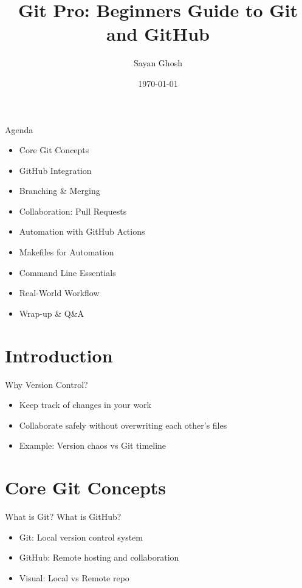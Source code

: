\documentclass[aspectratio=169]{beamer} %
\title[Git Pro]{Git Pro: Beginners Guide to Git and GitHub}
\author{Sayan Ghosh}
\institute{IC\&SR, IIT Madras}
\date{\today}
\begin{document}
\begin{frame}
  \titlepage
\end{frame}

\begin{frame}{Agenda}
  \begin{itemize}
    \item Core Git Concepts
    \item GitHub Integration
    \item Branching \& Merging
    \item Collaboration: Pull Requests
    \item Automation with GitHub Actions
    \item Makefiles for Automation
    \item Command Line Essentials
    \item Real-World Workflow
    \item Wrap-up \& Q\&A
  \end{itemize}
\end{frame}

\section{Introduction}

\begin{frame}{Why Version Control?}
  \begin{itemize}
    \item Keep track of changes in your work
    \item Collaborate safely without overwriting each other’s files
    \item Example: Version chaos vs Git timeline
  \end{itemize}
\end{frame}

\section{Core Git Concepts}

\begin{frame}{What is Git? What is GitHub?}
  \begin{itemize}
    \item Git: Local version control system
    \item GitHub: Remote hosting and collaboration
    \item Visual: Local vs Remote repo
  \end{itemize}
\end{frame}
\end{document}
